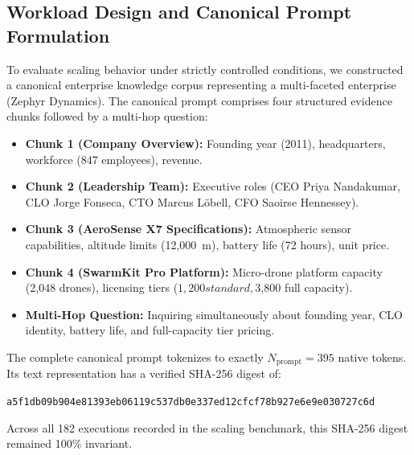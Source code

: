 \subsection{Workload Design and Canonical Prompt Formulation}
To evaluate scaling behavior under strictly controlled conditions, we constructed a canonical enterprise knowledge corpus representing a multi-faceted enterprise (Zephyr Dynamics). The canonical prompt comprises four structured evidence chunks followed by a multi-hop question:
\begin{itemize}
    \item \textbf{Chunk 1 (Company Overview):} Founding year (2011), headquarters, workforce (847 employees), revenue.
    \item \textbf{Chunk 2 (Leadership Team):} Executive roles (CEO Priya Nandakumar, CLO Jorge Fonseca, CTO Marcus L{\"o}bell, CFO Saoirse Hennessey).
    \item \textbf{Chunk 3 (AeroSense X7 Specifications):} Atmospheric sensor capabilities, altitude limits (12,000~m), battery life (72 hours), unit price.
    \item \textbf{Chunk 4 (SwarmKit Pro Platform):} Micro-drone platform capacity (2,048 drones), licensing tiers ($1,200 standard, $3,800 full capacity).
    \item \textbf{Multi-Hop Question:} Inquiring simultaneously about founding year, CLO identity, battery life, and full-capacity tier pricing.
\end{itemize}
The complete canonical prompt tokenizes to exactly $N_{\text{prompt}} = 395$ native tokens. Its text representation has a verified SHA-256 digest of:
\begin{center}
\texttt{a5f1db09b904e81393eb06119c537db0e337ed12cfcf78b927e6e9e030727c6d}
\end{center}
Across all 182 executions recorded in the scaling benchmark, this SHA-256 digest remained 100\% invariant.

